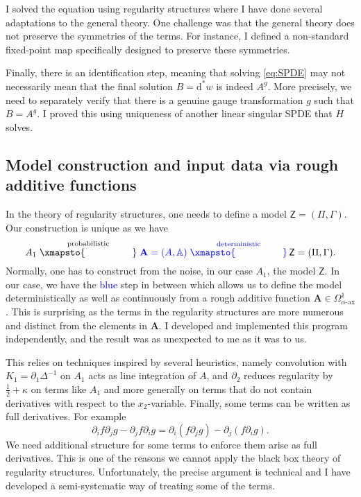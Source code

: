 \documentclass[12pt]{article}
\numberwithin{equation}{section}
\theoremstyle{definition}
\theoremstyle{remark}
\newcommand{\diff}{\mathrm{d}}
\newcommand{\1}{\mathbf 1}
\newcommand{\<}{\langle}
\renewcommand{\>}{\rangle}
\newcommand{\ax}{\text{-}\mathrm{ax}}
\newcommand{\bfA}{\mathbf A}
\newcommand{\bA}{\mathbb A}
\newcommand{\sfZ}{\mathsf Z}
\begin{document}
I solved the equation using regularity structures where I have done several adaptations to the general theory. One challenge was that the general theory does not preserve the symmetries of the terms. For instance, I defined a non-standard fixed-point map specifically designed to preserve these symmetries.

Finally, there is an identification step, meaning that solving \eqref{eq:SPDE} may not necessarily mean that the final solution $B=\diff^*w$ is indeed $A^g$. More precisely, we need to separately verify that there is a genuine gauge transformation $g$ such that $B=A^g$. I proved this using uniqueness of another linear singular SPDE that $H$ solves.


\subsection{Model construction and input data via rough additive functions}
In the theory of regularity structures, one needs to define a model $\sfZ=(\Pi,\Gamma)$. Our construction is unique as we have 
$$A_1\stackrel{\text{probabilistic}}{\xmapsto{\hspace{1.7cm}}} \textcolor{blue}{\bfA=(A,\bA) \stackrel{\text{deterministic}}{\xmapsto{\hspace{1.7cm}}}} \,\sfZ=(\Pi,\Gamma).$$
Normally, one has to construct from the noise, in our case $A_1$, the model $\sfZ$. In our case, we have the \textcolor{blue}{blue} step in between which allows us to define the model deterministically as well as continuously from a rough additive function $\bfA\in\Omega_{\alpha\ax}^1$. This is surprising as the terms in the regularity structures are more numerous and distinct from the elements in $\bfA$.  I developed and implemented this program independently, and the result was as unexpected to me as it was to us.

This relies on techniques inspired by several heuristics, namely convolution with $K_1=\partial_1 \Delta^{-1}$ on $A_1$ acts as line integration of $A$, and $\partial_2$ reduces regularity by $\frac 1 2+\kappa$ on terms like $A_1$ and more generally on terms that do not contain derivatives with respect to the $x_2$-variable. Finally, some terms can be written as full derivatives. For example
\[
\partial_i f\partial_j g-\partial_j f\partial_i g=\partial_i (f\partial_j g)-\partial_j (f\partial_i g). 
\]
We need additional structure for some terms to enforce them arise as full derivatives. This is one of the reasons we cannot apply the black box theory of regularity structures. Unfortunately, the precise argument is technical and I have developed a semi-systematic way of treating some of the terms.  
\end{document}
